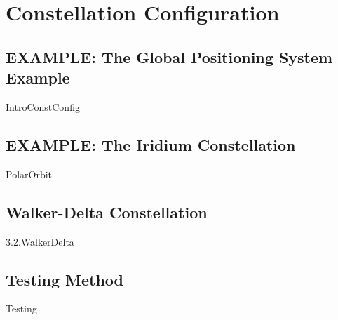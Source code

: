 \chapter{Constellation Configuration}

\section{EXAMPLE: The Global Positioning System Example}
{IntroConstConfig}

\section{EXAMPLE: The Iridium Constellation}
{PolarOrbit}

\section{Walker-Delta Constellation}
{3.2.WalkerDelta}

\section{Testing Method}
\label{Testing}
{Testing}